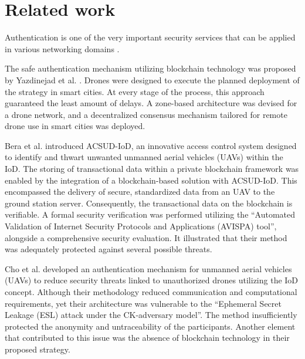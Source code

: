 \section{Related work}

Authentication is one of the very important security services that can be applied in various networking domains .

The safe authentication mechanism utilizing blockchain technology was proposed by Yazdinejad et al. . Drones were designed to execute the planned deployment of the strategy in smart cities. At every stage of the process, this approach guaranteed the least amount of delays. A zone-based architecture was devised for a drone network, and a decentralized consensus mechanism tailored for remote drone use in smart cities was deployed.

Bera et al. introduced ACSUD-IoD, an innovative access control system designed to identify and thwart unwanted unmanned aerial vehicles (UAVs) within the IoD. The storing of transactional data within a private blockchain framework was enabled by the integration of a blockchain-based solution with ACSUD-IoD. This encompassed the delivery of secure, standardized data from an UAV to the ground station server. Consequently, the transactional data on the blockchain is verifiable. A formal security verification was performed utilizing the ``Automated Validation of Internet Security Protocols and Applications (AVISPA) tool'', alongside a comprehensive security evaluation. It illustrated that their method was adequately protected against several possible threats.


Cho et al. developed an authentication mechanism for unmanned aerial vehicles (UAVs) to reduce security threats linked to unauthorized drones utilizing the IoD concept. Although their methodology reduced communication and computational requirements, yet their architecture was vulnerable to the ``Ephemeral Secret Leakage (ESL) attack under the CK-adversary model''. The method insufficiently protected the anonymity and untraceability of the participants. Another element that contributed to this issue was the absence of blockchain technology in their proposed strategy.


